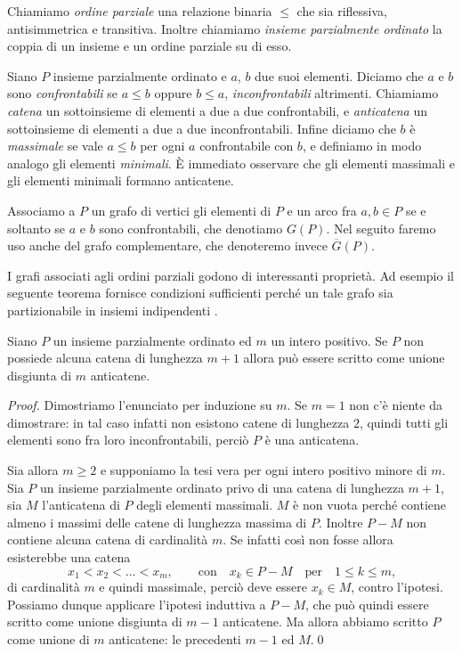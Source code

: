 \begin{definition}
  Chiamiamo \emph{ordine parziale} una relazione binaria \(\le\) che sia riflessiva, antisimmetrica e transitiva. Inoltre chiamiamo \emph{insieme parzialmente ordinato} la coppia di un insieme e un ordine parziale su di esso.
\end{definition}

Siano \(P\) insieme parzialmente ordinato e \(a\), \(b\) due suoi elementi. Diciamo che \(a\) e \(b\) sono \emph{confrontabili} se \(a\le b\) oppure \(b\le a\), \emph{inconfrontabili} altrimenti. Chiamiamo \emph{catena} un sottoinsieme di elementi a due a due confrontabili, e \emph{anticatena} un sottoinsieme di elementi a due a due inconfrontabili. Infine diciamo che \(b\) è \emph{massimale} se vale \(a\le b\) per ogni \(a\) confrontabile con \(b\), e definiamo in modo analogo gli elementi \emph{minimali}. È immediato osservare che gli elementi massimali e gli elementi minimali formano anticatene.

Associamo a \(P\) un grafo di vertici gli elementi di \(P\) e un arco fra \(a\text{,}\,b\in P\) se e soltanto se \(a\) e \(b\) sono confrontabili, che denotiamo \(G(P)\). Nel seguito faremo uso anche del grafo complementare, che denoteremo invece \(\overline{G}(P)\).

I grafi associati agli ordini parziali godono di interessanti proprietà. Ad esempio il seguente teorema fornisce condizioni sufficienti perché un tale grafo sia partizionabile in insiemi indipendenti \cite{Mirsky1971}.
\begin{theorem}
  [Mirsky] \label{mirskytheorem} Siano \(P\) un insieme parzialmente ordinato ed \(m\) un intero positivo. Se \(P\) non possiede alcuna catena di lunghezza \(m+1\) allora può essere scritto come unione disgiunta di \(m\) anticatene. 
\end{theorem}
\begin{proof}
  Dimostriamo l'enunciato per induzione su \(m\). Se \(m=1\) non c'è niente da dimostrare: in tal caso infatti non esistono catene di lunghezza \(2\), quindi tutti gli elementi sono fra loro inconfrontabili, perciò \(P\) è una anticatena. 
  
  Sia allora \(m\ge 2\) e supponiamo la tesi vera per ogni intero positivo minore di \(m\). Sia \(P\) un insieme parzialmente ordinato privo di una catena di lunghezza \(m+1\), sia \(M\) l'anticatena di \(P\) degli elementi massimali. \(M\) è non vuota perché contiene almeno i massimi delle catene di lunghezza massima di \(P\). Inoltre \(P-M\) non contiene alcuna catena di cardinalità \(m\). Se infatti così non fosse allora esisterebbe una catena
  \[
  x_1 < x_2 < \dots < x_m,  \qquad\text{con}\quad x_k \in P-M\quad\text{per}\quad 1\le k \le m\text{,}
  \]
  di cardinalità \(m\) e quindi massimale, perciò deve essere \(x_k\in M\), contro l'ipotesi. Possiamo dunque applicare l'ipotesi induttiva a \(P-M\), che può quindi essere scritto come unione disgiunta di \(m-1\) anticatene. Ma allora abbiamo scritto \(P\) come unione di \(m\) anticatene: le precedenti \(m-1\) ed \(M\).\qed
\end{proof}

